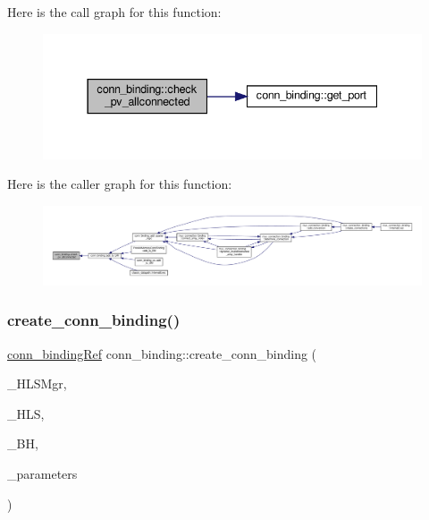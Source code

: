 Here is the call graph for this function\+:
\nopagebreak
\begin{figure}[H]
\begin{center}
\leavevmode
\includegraphics[width=337pt]{d2/db1/classconn__binding_af11f0bf92436cc8c5b6eb7002544f3dc_cgraph}
\end{center}
\end{figure}
Here is the caller graph for this function\+:
\nopagebreak
\begin{figure}[H]
\begin{center}
\leavevmode
\includegraphics[width=350pt]{d2/db1/classconn__binding_af11f0bf92436cc8c5b6eb7002544f3dc_icgraph}
\end{center}
\end{figure}
\mbox{\label{classconn__binding_af189b02ddea6e39918e098877b96b73c}} 
\subsubsection{\texorpdfstring{create\+\_\+conn\+\_\+binding()}{create\_conn\_binding()}}
{\footnotesize\ttfamily \hyperlink{conn__binding_8hpp_a074d084f1d6f4503d815ba91304264a0}{conn\+\_\+binding\+Ref} conn\+\_\+binding\+::create\+\_\+conn\+\_\+binding (\begin{DoxyParamCaption}\item[{const \hyperlink{hls__manager_8hpp_acd3842b8589fe52c08fc0b2fcc813bfe}{H\+L\+S\+\_\+manager\+Ref}}]{\+\_\+\+H\+L\+S\+Mgr,  }\item[{const \hyperlink{hls_8hpp_a75d0c73923d0ddfa28c4843a802c73a7}{hls\+Ref}}]{\+\_\+\+H\+LS,  }\item[{const \hyperlink{behavioral__helper_8hpp_aae973b54cac87eef3b27442aa3e1e425}{Behavioral\+Helper\+Const\+Ref}}]{\+\_\+\+BH,  }\item[{const \hyperlink{Parameter_8hpp_a37841774a6fcb479b597fdf8955eb4ea}{Parameter\+Const\+Ref}}]{\+\_\+parameters }\end{DoxyParamCaption})\hspace{0.3cm}{\ttfamily [static]}}



